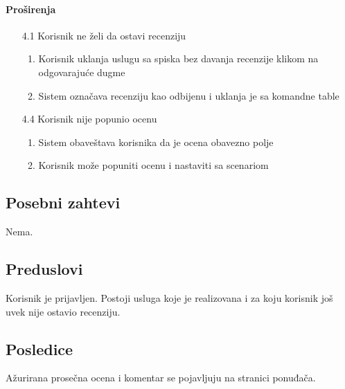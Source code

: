 \documentclass[a4paper,12pt]{report}
\begin{document}
			\paragraph*{Proširenja}
				\begin{enumerate}
					\item[4.1] Korisnik ne želi da ostavi recenziju
						\begin{enumerate}[noitemsep,topsep=-8pt]
							\item Korisnik uklanja uslugu sa spiska bez davanja recenzije klikom na odgovarajuće dugme
							\item Sistem označava recenziju kao odbijenu i uklanja je sa komandne table
						\end{enumerate}
					\item[4.4] Korisnik nije popunio ocenu
						\begin{enumerate}[noitemsep,topsep=-8pt]
							\item Sistem obaveštava korisnika da je ocena obavezno polje
							\item Korisnik može popuniti ocenu i nastaviti sa scenariom
						\end{enumerate}
				\end{enumerate}
		\subsection{Posebni zahtevi}
			Nema.
		\subsection{Preduslovi}
			Korisnik je prijavljen. Postoji usluga koje je realizovana i za koju korisnik još uvek nije ostavio recenziju.
		\subsection{Posledice}
			Ažurirana prosečna ocena i komentar se pojavljuju na stranici ponuđača.
\end{document}
